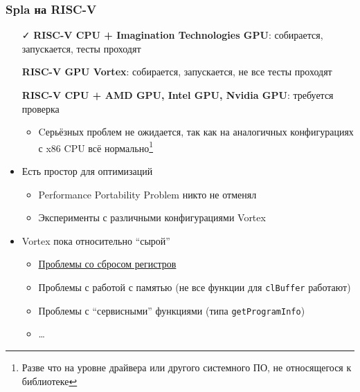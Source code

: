 \documentclass[xcolor=table,aspectratio=169]{beamer}
\begin{document}
\begin{frame}[fragile]
  \frametitle{Spla на RISC-V}
  \begin{itemize}
    \item[\faCheck] \textbf{RISC-V CPU + Imagination Technologies GPU}: собирается, запускается, тесты проходят
    \item[\faGears] \textbf{RISC-V GPU Vortex}: собирается, запускается, не все тесты проходят    
    \item[\faHourglassHalf] \textbf{RISC-V CPU + AMD GPU, Intel GPU, Nvidia GPU}: требуется проверка
    \begin{itemize}
      \item Cерьёзных проблем не ожидается, так как на аналогичных конфигурациях с x86 CPU всё нормально\footnote{Разве что на уровне драйвера или другого системного ПО, не относящегося к библиотеке}
    \end{itemize}
    \vfill
    \item Есть простор для оптимизаций
    \begin{itemize}
      \item Performance Portability Problem никто не отменял
      \item Эксперименты с различными конфигурациями Vortex      
    \end{itemize}
    \item Vortex пока относительно ``сырой''
    \begin{itemize}
      \item \href{https://github.com/vortexgpgpu/vortex/issues/251}{Проблемы со сбросом регистров}
      \item Проблемы с работой с памятью (не все функции для \texttt{clBuffer} работают)
      \item Проблемы с ``сервисными'' функциями (типа \texttt{getProgramInfo})
      \item \ldots
    \end{itemize}
  \end{itemize}
\end{frame}
\end{document}
